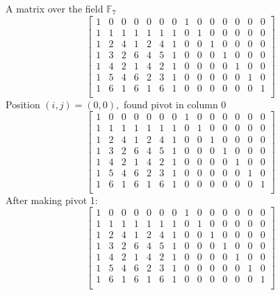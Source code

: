 \noindent A matrix over the field ${\mathbb F}_{7}$\\
$$
\left[
\begin{array}{*{14}{c}}
1 & 0 & 0 & 0 & 0 & 0 & 0 & 1 & 0 & 0 & 0 & 0 & 0 & 0\\
1 & 1 & 1 & 1 & 1 & 1 & 1 & 0 & 1 & 0 & 0 & 0 & 0 & 0\\
1 & 2 & 4 & 1 & 2 & 4 & 1 & 0 & 0 & 1 & 0 & 0 & 0 & 0\\
1 & 3 & 2 & 6 & 4 & 5 & 1 & 0 & 0 & 0 & 1 & 0 & 0 & 0\\
1 & 4 & 2 & 1 & 4 & 2 & 1 & 0 & 0 & 0 & 0 & 1 & 0 & 0\\
1 & 5 & 4 & 6 & 2 & 3 & 1 & 0 & 0 & 0 & 0 & 0 & 1 & 0\\
1 & 6 & 1 & 6 & 1 & 6 & 1 & 0 & 0 & 0 & 0 & 0 & 0 & 1\\
\end{array}
\right]
$$
\noindent  Position $(i,j)=(0,0),$ found pivot in column 0\\
$$
\left[
\begin{array}{*{14}{c}}
1 & 0 & 0 & 0 & 0 & 0 & 0 & 1 & 0 & 0 & 0 & 0 & 0 & 0\\
1 & 1 & 1 & 1 & 1 & 1 & 1 & 0 & 1 & 0 & 0 & 0 & 0 & 0\\
1 & 2 & 4 & 1 & 2 & 4 & 1 & 0 & 0 & 1 & 0 & 0 & 0 & 0\\
1 & 3 & 2 & 6 & 4 & 5 & 1 & 0 & 0 & 0 & 1 & 0 & 0 & 0\\
1 & 4 & 2 & 1 & 4 & 2 & 1 & 0 & 0 & 0 & 0 & 1 & 0 & 0\\
1 & 5 & 4 & 6 & 2 & 3 & 1 & 0 & 0 & 0 & 0 & 0 & 1 & 0\\
1 & 6 & 1 & 6 & 1 & 6 & 1 & 0 & 0 & 0 & 0 & 0 & 0 & 1\\
\end{array}
\right]
$$
\noindent After making pivot 1:\\
$$
\left[
\begin{array}{*{14}{c}}
1 & 0 & 0 & 0 & 0 & 0 & 0 & 1 & 0 & 0 & 0 & 0 & 0 & 0\\
1 & 1 & 1 & 1 & 1 & 1 & 1 & 0 & 1 & 0 & 0 & 0 & 0 & 0\\
1 & 2 & 4 & 1 & 2 & 4 & 1 & 0 & 0 & 1 & 0 & 0 & 0 & 0\\
1 & 3 & 2 & 6 & 4 & 5 & 1 & 0 & 0 & 0 & 1 & 0 & 0 & 0\\
1 & 4 & 2 & 1 & 4 & 2 & 1 & 0 & 0 & 0 & 0 & 1 & 0 & 0\\
1 & 5 & 4 & 6 & 2 & 3 & 1 & 0 & 0 & 0 & 0 & 0 & 1 & 0\\
1 & 6 & 1 & 6 & 1 & 6 & 1 & 0 & 0 & 0 & 0 & 0 & 0 & 1\\
\end{array}
\right]
$$

